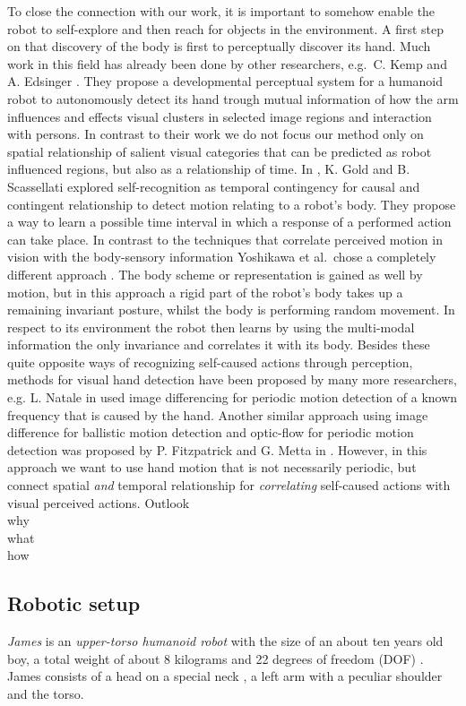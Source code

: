 \documentclass[conference]{IEEEtran}
\begin{document}
To close the connection with our work, it is important to somehow enable the robot to self-explore and then reach for objects in the environment. A first step on that discovery of the body is first to perceptually discover its hand. 
Much work in this field has already been done by other researchers, e.g.\ C. Kemp and A. Edsinger \cite{WCIC06new}. They propose a developmental perceptual system for a humanoid robot to autonomously detect its hand trough mutual information of how the arm influences and effects visual clusters in selected image regions and interaction with persons. In contrast to their work we do not focus our method only on spatial relationship of salient visual categories that can be predicted as robot influenced regions, but also as a relationship of time. In \cite{LAWC06}, K. Gold and B. Scassellati explored self-recognition as temporal contingency for causal and contingent relationship to detect motion relating to a robot's body. They propose a way to learn a possible time interval in which a response of a performed action can take place. In contrast to the techniques that correlate perceived motion in vision with the body-sensory information Yoshikawa et al.\ chose a completely different approach \cite{DIMMRBS03-03}. The body scheme or representation is gained as well by motion, but in this approach a rigid part of the robot's body takes up a remaining invariant posture, whilst the body is performing random movement. In respect to its environment the robot then learns by using the multi-modal information the only invariance and correlates it with its body.
Besides these quite opposite ways of recognizing self-caused actions through perception, methods for visual hand detection have been proposed by many more researchers, e.g. L. Natale in \cite{HRDAG04} used image differencing for periodic motion detection of a known frequency that is caused by the hand. Another similar approach using image difference for ballistic motion detection and optic-flow for periodic motion detection was proposed by P. Fitzpatrick and G. Metta in \cite{LAOTA03}. However, in this approach we want to use hand motion that is not necessarily periodic, but connect spatial \textit{and} temporal relationship for \textit{correlating} self-caused actions with visual perceived actions.\newline
Outlook\\
why\\
what\\
how\\
\subsection{Robotic setup}
\textit{James} is an \textit{upper-torso humanoid robot} with the size of an about ten years old boy, a total weight of about 8 kilograms and 22 degrees of freedom (DOF) \cite{JHRAUW06-12}. James consists of a head on a special neck , a left arm with a peculiar shoulder and the torso.
\end{document}
